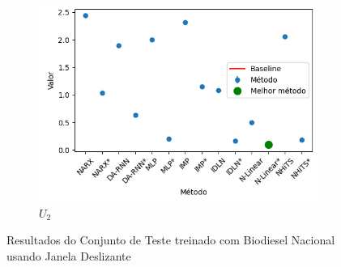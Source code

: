 \begin{figure}[htbp]
\begin{subfigure}[b]{0.3\textwidth}
		\includegraphics[width=\textwidth]{figuras/u2_brasil_results_test.png}
		\caption{\(U_2\)}
		\label{fig:u2_brasil_results_test}
	\end{subfigure}
	\caption{Resultados do Conjunto de Teste treinado com Biodiesel Nacional usando Janela Deslizante}
	\label{fig:brasil_results_test}
\end{figure}

